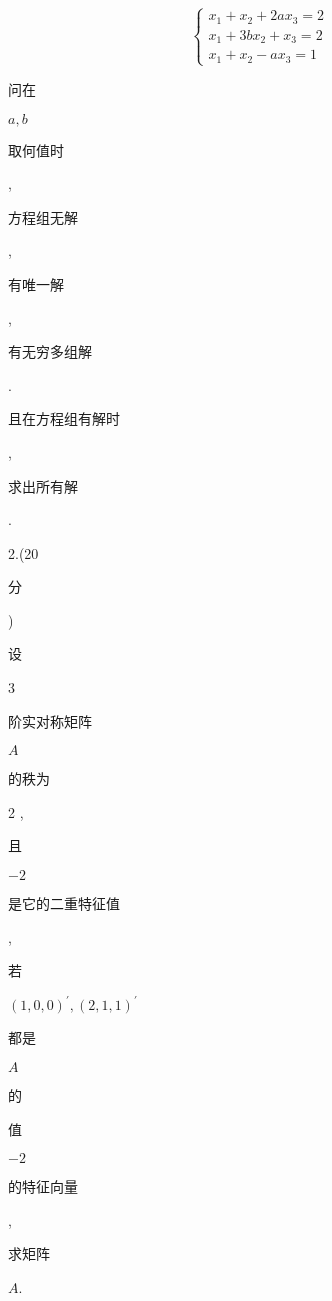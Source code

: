 \documentclass[10pt]{article}
\begin{document}
$$
\left\{\begin{array}{l}
x_{1}+x_{2}+2 a x_{3}=2 \\
x_{1}+3 b x_{2}+x_{3}=2 \\
x_{1}+x_{2}-a x_{3}=1
\end{array}\right.
$$
\begin{CJK}{UTF8}{mj}问在\end{CJK} $a, b$ \begin{CJK}{UTF8}{mj}取何值时\end{CJK}, \begin{CJK}{UTF8}{mj}方程组无解\end{CJK}, \begin{CJK}{UTF8}{mj}有唯一解\end{CJK}, \begin{CJK}{UTF8}{mj}有无穷多组解\end{CJK}. \begin{CJK}{UTF8}{mj}且在方程组有解时\end{CJK}, \begin{CJK}{UTF8}{mj}求出所有解\end{CJK}.

2.(20 \begin{CJK}{UTF8}{mj}分\end{CJK}) \begin{CJK}{UTF8}{mj}设\end{CJK} 3 \begin{CJK}{UTF8}{mj}阶实对称矩阵\end{CJK} $A$ \begin{CJK}{UTF8}{mj}的秩为\end{CJK} 2 , \begin{CJK}{UTF8}{mj}且\end{CJK} $-2$ \begin{CJK}{UTF8}{mj}是它的二重特征值\end{CJK}, \begin{CJK}{UTF8}{mj}若\end{CJK} $(1,0,0)^{\prime},(2,1,1)^{\prime}$ \begin{CJK}{UTF8}{mj}都是\end{CJK} $A$ \begin{CJK}{UTF8}{mj}的\end{CJK} \begin{CJK}{UTF8}{mj}值\end{CJK} $-2$ \begin{CJK}{UTF8}{mj}的特征向量\end{CJK}, \begin{CJK}{UTF8}{mj}求矩阵\end{CJK} $A$.
\end{document}
